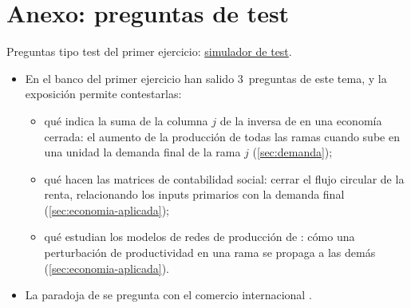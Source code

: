 \documentclass[11pt]{article}
\begin{document}
\section{Anexo: preguntas de test}\label{anexo:test}

\begin{anotaciones}Preguntas tipo test del primer ejercicio: \href{https://www.victorgutierrezmarcos.es/oposicion/temario/primer-ejercicio/test/simulador.html?tema=3.A.31}{simulador de test}.\end{anotaciones}

\begin{itemize}
\item En el banco del primer ejercicio han salido 3~preguntas de este tema, y la exposición permite contestarlas:
  \begin{itemize}
  \item qué indica la suma de la columna $j$ de la inversa de  en una economía cerrada: el aumento de la producción de todas las ramas cuando sube en una unidad la demanda final de la rama $j$ (\ref{sec:demanda});
  \item qué hacen las matrices de contabilidad social: cerrar el flujo circular de la renta, relacionando los inputs primarios con la demanda final (\ref{sec:economia-aplicada});
  \item qué estudian los modelos de redes de producción de \textcite{AcemogluEtAl2012Network}: cómo una perturbación de productividad en una rama se propaga a las demás (\ref{sec:economia-aplicada}).
  \end{itemize}
\item La paradoja de  se pregunta con el comercio internacional .
\end{itemize}


\bibliografia
\end{document}
